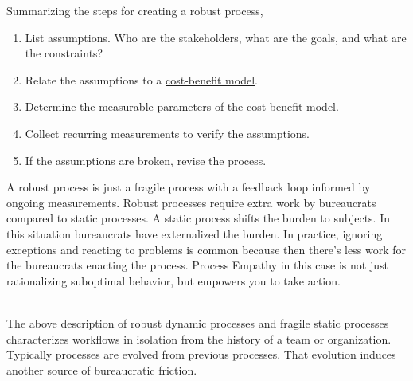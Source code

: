 Summarizing the steps for creating a robust process,
\begin{enumerate}
    \item List assumptions. %
    Who are the stakeholders, what are the goals, and what are the constraints?
    \item Relate the assumptions to a \href{https://en.wikipedia.org/wiki/Cost\%E2\%80\%93benefit_analysis}{cost-benefit model}.
    \iftoggle{WPinmargin}{\marginpar{$>$Wikipedia: cost-benefit model}}{}
    \item Determine the measurable parameters of the cost-benefit model. 
    \item Collect recurring measurements to verify the assumptions. 
    \item If the assumptions are broken, revise the process. 
\end{enumerate}
A robust process is just a fragile process with a feedback loop informed by ongoing measurements. Robust processes require extra work by bureaucrats compared to static processes. A static process shifts the burden to subjects. In this situation bureaucrats have externalized the burden.
In practice, ignoring exceptions and reacting to problems is common because then there's less work for the bureaucrats enacting the process. Process Empathy in this case is not just rationalizing suboptimal behavior, but empowers you to take action. 

\ \\

The above description of robust dynamic processes and fragile static processes characterizes workflows in isolation from the history of a team or organization. Typically processes are evolved from previous processes.  That evolution induces another source of bureaucratic friction. 